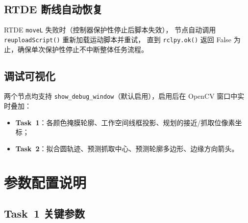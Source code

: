 \documentclass[12pt,a4paper]{article}
\begin{document}
\subsection{RTDE 断线自动恢复}

RTDE \texttt{moveL} 失败时（控制器保护性停止后脚本失效），
节点自动调用 \texttt{reuploadScript()} 重新加载运动脚本并重试，
直到 \texttt{rclpy.ok()} 返回 False 为止，确保单次保护性停止不中断整体任务流程。

\subsection{调试可视化}

两个节点均支持 \texttt{show\_debug\_window}（默认启用），启用后在 OpenCV 窗口中实时叠加：
\begin{itemize}[noitemsep]
  \item \textbf{Task~1}：各颜色掩膜轮廓、工作空间线框投影、规划的接近/抓取位像素坐标；
  \item \textbf{Task~2}：拟合圆轨迹、预测抓取中心、预测轮廓多边形、边缘方向箭头。
\end{itemize}

\section{参数配置说明}

\subsection{Task~1 关键参数}
\end{document}
